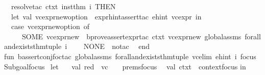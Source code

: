 \begin{isabellebody}
\ \ {\isacharparenleft}{\kern0pt}resolve{\isacharunderscore}{\kern0pt}tac\ ctxt\ {\isacharbrackleft}{\kern0pt}inst{\isacharunderscore}{\kern0pt}thm{\isacharbrackright}{\kern0pt}\ i{\isacharparenright}{\kern0pt}\ THEN\isanewline
\ \ {\isacharparenleft}{\kern0pt}let\ val\ vc{\isacharunderscore}{\kern0pt}expr{\isacharunderscore}{\kern0pt}new{\isacharunderscore}{\kern0pt}option\ {\isacharequal}{\kern0pt}\ expr{\isacharunderscore}{\kern0pt}hint{\isacharunderscore}{\kern0pt}assert{\isacharunderscore}{\kern0pt}tac\ ehint\ vc{\isacharunderscore}{\kern0pt}expr\ in\ \isanewline
\ \ case\ vc{\isacharunderscore}{\kern0pt}expr{\isacharunderscore}{\kern0pt}new{\isacharunderscore}{\kern0pt}option\ of\ \isanewline
\ \ \ \ \ SOME\ vc{\isacharunderscore}{\kern0pt}expr{\isacharunderscore}{\kern0pt}new\ {\isacharequal}{\kern0pt}{\isachargreater}{\kern0pt}\ b{\isacharunderscore}{\kern0pt}prove{\isacharunderscore}{\kern0pt}assert{\isacharunderscore}{\kern0pt}expr{\isacharunderscore}{\kern0pt}tac\ ctxt\ vc{\isacharunderscore}{\kern0pt}expr{\isacharunderscore}{\kern0pt}new\ global{\isacharunderscore}{\kern0pt}assms\ forall{\isacharunderscore}{\kern0pt}and{\isacharunderscore}{\kern0pt}exists{\isacharunderscore}{\kern0pt}thm{\isacharunderscore}{\kern0pt}tuple\ i\isanewline
\ \ {\isacharbar}{\kern0pt}\ \ NONE\ {\isacharequal}{\kern0pt}{\isachargreater}{\kern0pt}\ no{\isacharunderscore}{\kern0pt}tac\isanewline
\ \ end{\isacharparenright}{\kern0pt}\isanewline
\ \isanewline
fun\ b{\isacharunderscore}{\kern0pt}assert{\isacharunderscore}{\kern0pt}conj{\isacharunderscore}{\kern0pt}foc{\isacharunderscore}{\kern0pt}tac\ global{\isacharunderscore}{\kern0pt}assms\ forall{\isacharunderscore}{\kern0pt}and{\isacharunderscore}{\kern0pt}exists{\isacharunderscore}{\kern0pt}thm{\isacharunderscore}{\kern0pt}tuple\ vc{\isacharunderscore}{\kern0pt}elim\ ehint\ i\ {\isacharparenleft}{\kern0pt}focus{\isacharcolon}{\kern0pt}\ Subgoal{\isachardot}{\kern0pt}focus{\isacharparenright}{\kern0pt}\ {\isacharequal}{\kern0pt}\isanewline
let\ \isanewline
\ \ val\ {\isacharparenleft}{\kern0pt}red\ {\isacharcolon}{\kern0pt}{\isacharcolon}{\kern0pt}\ vc\ {\isacharcolon}{\kern0pt}{\isacharcolon}{\kern0pt}\ {\isacharunderscore}{\kern0pt}{\isacharparenright}{\kern0pt}\ {\isacharequal}{\kern0pt}\ {\isacharhash}{\kern0pt}prems{\isacharparenleft}{\kern0pt}focus{\isacharparenright}{\kern0pt}\isanewline
\ \ val\ ctxt\ {\isacharequal}{\kern0pt}\ {\isacharhash}{\kern0pt}context{\isacharparenleft}{\kern0pt}focus{\isacharparenright}{\kern0pt}\isanewline
in\isanewline

\end{isabellebody}

